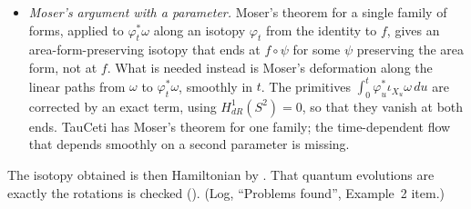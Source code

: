 \documentclass[11pt]{article}
\begin{document}
\begin{enumerate}
\begin{itemize}
    diffeomorphisms of the disc fixing its boundary follows from the disc theorem, which TauCeti
    has. The core, that these form a connected group, is missing. It needs a smooth Schoenflies
    theorem for arcs in the disc, or uniformization with parameters, and TauCeti has neither.
  \item \emph{Moser's argument with a parameter.} Moser's theorem for a single family of forms,
    applied to $\varphi_t^*\omega$ along an isotopy $\varphi_t$ from the identity to $f$, gives
    an area-form-preserving isotopy that ends at $f \circ \psi$ for some $\psi$ preserving the area
    form, not at $f$. What is needed instead is Moser's deformation along the linear paths from
    $\omega$ to $\varphi_t^*\omega$, smoothly in $t$. The primitives
    $\int_0^t \varphi_u^*\iota_{X_u}\omega\,du$ are corrected by an exact term, using
    $H^1_{dR}(S^2) = 0$, so that they vanish at both ends. TauCeti has Moser's theorem for one
    family; the time-dependent flow that depends smoothly on a second parameter is missing.
  \end{itemize}
  The isotopy obtained is then Hamiltonian by
  . That quantum evolutions are
  exactly the rotations is checked (). (Log, ``Problems
  found'', Example~2 item.)
\end{enumerate}
\end{document}
